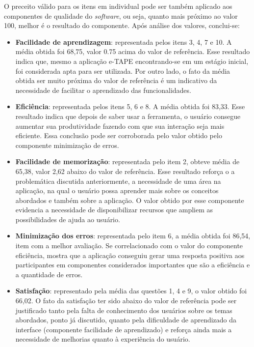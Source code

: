 O preceito válido para os itens em individual pode ser também aplicado aos componentes de qualidade do \textit{software}, ou seja, quanto mais próximo ao valor 100, melhor é o resultado do componente.
Após análise dos valores, conclui-se:
\begin{itemize}
    \item \textbf{Facilidade de aprendizagem}: representada pelos itens 3, 4, 7 e 10. A média obtida foi 68,75, valor 0.75 acima do valor de referência. Esse resultado indica que, mesmo a aplicação e-TAPE encontrando-se em um estágio inicial, foi considerada apta para ser utilizada. Por outro lado, o fato da média obtida ser muito próxima do valor de referência é um indicativo da necessidade de facilitar o aprendizado das funcionalidades. 

    \item \textbf{Eficiência}: representada pelos itens 5, 6 e 8. A média obtida foi 83,33. Esse resultado indica que depois de saber usar a ferramenta, o usuário consegue aumentar sua produtividade fazendo com que sua interação seja mais eficiente. Essa conclusão pode ser corroborada pelo valor obtido pelo componente minimização de erros.

    \item \textbf{Facilidade de memorização}: representada pelo item 2, obteve média de 65,38, valor 2,62 abaixo do valor de referência. Esse resultado reforça o a problemática discutida anteriormente, a necessidade de uma área na aplicação, na qual o usuário possa aprender mais sobre os conceitos abordados e também sobre 
          a aplicação. O valor obtido por esse componente evidencia a necessidade de disponibilizar recursos que ampliem as possibilidades de ajuda ao usuário.

    \item \textbf{Minimização dos erros}: representada pelo item 6, a média obtida foi 86,54, item com a melhor avaliação. Se correlacionado com o valor do componente eficiência, mostra que a aplicação conseguiu gerar uma resposta positiva aos participantes em componentes considerados importantes que são a eficiência e a quantidade de erros. 

    \item \textbf{Satisfação}: representado pela média das questões 1, 4 e 9, o valor obtido foi 66,02. O fato da satisfação ter sido abaixo do valor de referência pode ser justificado tanto pela falta de conhecimento dos usuários sobre os temas abordados, ponto já discutido, quanto pela dificuldade de aprendizado da interface (componente facilidade de aprendizado) e reforça ainda mais a necessidade de melhorias quanto à experiência do usuário. 
         
\end{itemize}


